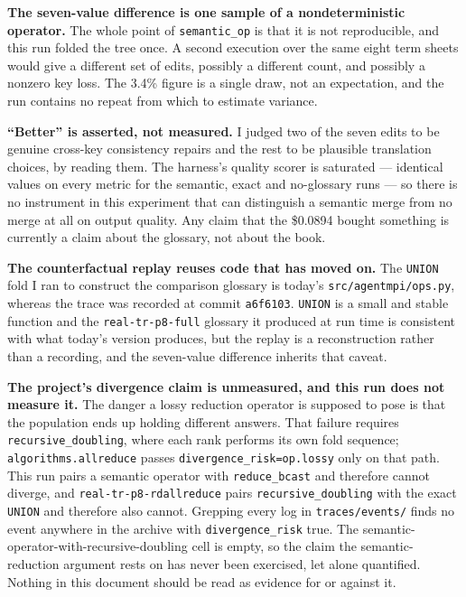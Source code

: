\documentclass[11pt]{article}
\begin{document}
\textbf{The seven-value difference is one sample of a nondeterministic operator.} The whole point
of \texttt{semantic\_op} is that it is not reproducible, and this run folded the tree once. A
second execution over the same eight term sheets would give a different set of edits, possibly a
different count, and possibly a nonzero key loss. The 3.4\% figure is a single draw, not an
expectation, and the run contains no repeat from which to estimate variance.

\textbf{``Better'' is asserted, not measured.} I judged two of the seven edits to be genuine
cross-key consistency repairs and the rest to be plausible translation choices, by reading them.
The harness's quality scorer is saturated --- identical values on every metric for the semantic,
exact and no-glossary runs --- so there is no instrument in this experiment that can distinguish
a semantic merge from no merge at all on output quality. Any claim that the \$0.0894 bought
something is currently a claim about the glossary, not about the book.

\textbf{The counterfactual replay reuses code that has moved on.} The \texttt{UNION} fold I ran
to construct the comparison glossary is today's \texttt{src/agentmpi/ops.py}, whereas the trace
was recorded at commit \texttt{a6f6103}. \texttt{UNION} is a small and stable function and the
\texttt{real-tr-p8-full} glossary it produced at run time is consistent with what today's version
produces, but the replay is a reconstruction rather than a recording, and the seven-value
difference inherits that caveat.

\textbf{The project's divergence claim is unmeasured, and this run does not measure it.} The
danger a lossy reduction operator is supposed to pose is that the population ends up holding
different answers. That failure requires \texttt{recursive\_doubling}, where each rank performs
its own fold sequence; \texttt{algorithms.allreduce} passes \texttt{divergence\_risk=op.lossy}
only on that path. This run pairs a semantic operator with \texttt{reduce\_bcast} and therefore
cannot diverge, and \texttt{real-tr-p8-rdallreduce} pairs \texttt{recursive\_doubling} with the
exact \texttt{UNION} and therefore also cannot. Grepping every log in
\texttt{traces/events/} finds no event anywhere in the archive with
\texttt{divergence\_risk} true. The semantic-operator-with-recursive-doubling cell is empty, so
the claim the semantic-reduction argument rests on has never been exercised, let alone
quantified. Nothing in this document should be read as evidence for or against it.
\end{document}
